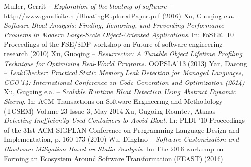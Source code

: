 \clearpage
{}

\begin{thebibliography}{99}
		{Muller, Gerrit --
			\emph{Exploration of the bloating of software} --\\
				\href{http://www.gaudisite.nl/BloatingExploredPaper.pdf}
					{http://www.gaudisite.nl/BloatingExploredPaper.pdf} 
				(2016)}
		{Xu, Guoqing e.a. -- 
			\emph{Software Bloat Analysis: Finding, Removing, and
					Preventing Performance Problems in Modern Large-Scale
					Object-Oriented Applications}. In: FoSER '10
					Proceedings of the FSE/SDP workshop on Future of software
					engineering research (2010)}
		{Xu, Guoqing -- 
			\emph{Resurrector: A Tunable Object Lifetime Profiling
				Technique for Optimizing Real-World Programs.} OOPSLA'13 (2013)}
		{Yan, Dacong --
			\emph{LeakChecker: Practical Static Memory Leak Detection for Managed Languages,
			CGO'14: International Conference on Code Generation and Optimization (2014)}
		}
		{Xu, Gugoing e.a. -- 
			\emph{Scalable Runtime Bloat Detection Using Abstract Dynamic Slicing}. In:
			ACM Transactions on Software Engineering and Methodology (TOSEM) Volume 23 Issue 3, May 2014}
		{Xu, Gugoing Rountev, Atanas --
			\emph{Detecting Inefficiently-Used Containers to Avoid Bloat}. In:
			PLDI '10 Proceedings of the 31st ACM SIGPLAN Conference on Programming Language Design and Implementation,
			p. 160-173 (2010)}
		{Wu, Dinghao -- 
			\emph{Software Customization and Bloatware
				Mitigation Based on Static Analysis}. In: The 2016 workshop
				on Forming an Ecosystem Around Software Transformation (FEAST) (2016)}
\end{thebibliography}
